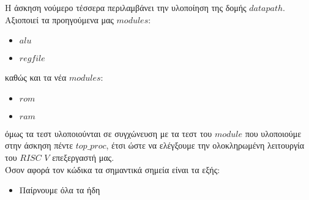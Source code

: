 Η άσκηση νούμερο τέσσερα περιλαμβάνει την υλοποίηση της δομής $datapath$.
Αξιοποιεί τα προηγούμενα μας $modules$:
\begin{itemize}
    \item $alu$
    \item $regfile$
\end{itemize}
καθώς και τα νέα $modules$:
\begin{itemize}
    \item $rom$
    \item $ram$
\end{itemize}
όμως τα τεστ υλοποιούνται σε συγχώνευση με τα τεστ του $module$ που υλοποιούμε 
στην άσκηση πέντε $top\_proc$, έτσι ώστε να ελέγξουμε την ολοκληρωμένη λειτουργία
του $RISC$ $V$ επεξεργαστή μας.
\\
Όσον αφορά τον κώδικα τα σημαντικά σημεία είναι τα εξής:
\begin{itemize}
    \item Παίρνουμε όλα τα ήδη 

\end{itemize}